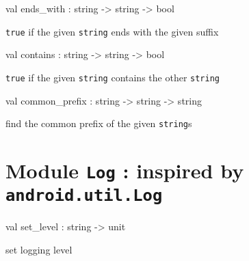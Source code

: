 \documentclass[11pt]{article}
\begin{document}
\label{val:Util.ends-underscorewith}\begin{ocamldoccode}
val ends_with : string -> string -> bool
\end{ocamldoccode}
\begin{ocamldocdescription}
{\tt{true}} if the given {\tt{string}} ends with the given suffix


\end{ocamldocdescription}




\label{val:Util.contains}\begin{ocamldoccode}
val contains : string -> string -> bool
\end{ocamldoccode}
\begin{ocamldocdescription}
{\tt{true}} if the given {\tt{string}} contains the other {\tt{string}}


\end{ocamldocdescription}




\label{val:Util.common-underscoreprefix}\begin{ocamldoccode}
val common_prefix : string -> string -> string
\end{ocamldoccode}
\begin{ocamldocdescription}
find the common prefix of the given {\tt{string}}s


\end{ocamldocdescription}


\section{Module {\tt{Log}} : inspired by {\tt{android.util.Log}}}
\label{module:Log}




\ocamldocvspace{0.5cm}



\label{val:Log.set-underscorelevel}\begin{ocamldoccode}
val set_level : string -> unit
\end{ocamldoccode}
\begin{ocamldocdescription}
set logging level


\end{ocamldocdescription}
\end{document}
